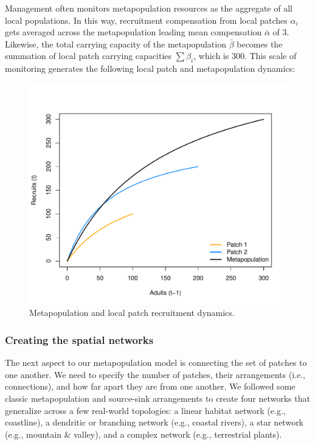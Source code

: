 \documentclass[]{article}
\begin{document}
Management often monitors metapopulation resources as the aggregate of
all local populations. In this way, recruitment compensation from local
patches \(\alpha_i\) gets averaged across the metapopulation leading
mean compensation \(\bar{\alpha}\) of 3. Likewise, the total carrying
capacity of the metapopulation \(\bar{\beta}\) becomes the summation of
local patch carrying capacities \(\sum\beta_i\), which is 300. This
scale of monitoring generates the following local patch and
metapopulation dynamics:

\begin{figure}[H]

{\centering \includegraphics{Managing_for_ecological_surprises_in_metapopulations_makeHTML_files/figure-latex/recruit curves-1} 

}

\caption{Metapopulation and local patch recruitment dynamics.}\label{fig:recruit curves}
\end{figure}

\hypertarget{creating-the-spatial-networks}{%
\subsubsection{Creating the spatial
networks}\label{creating-the-spatial-networks}}

The next aspect to our metapopulation model is connecting the set of
patches to one another. We need to specify the number of patches, their
arrangements (i.e., connections), and how far apart they are from one
another. We followed some classic metapopulation and source-sink
arrangements to create four networks that generalize across a few
real-world topologies: a linear habitat network (e.g., coastline), a
dendritic or branching network (e.g., coastal rivers), a star network
(e.g., mountain \& valley), and a complex network (e.g., terrestrial
plants).
\end{document}
